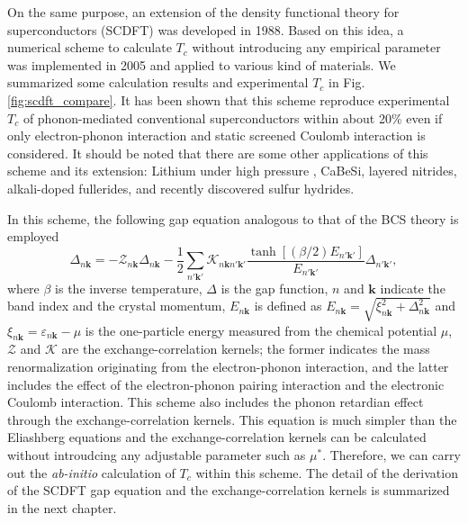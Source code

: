 On the same purpose, an extension of the density functional theory for superconductors (SCDFT)
was developed in 1988\cite{Oliveira1988}. Based on this idea, a numerical scheme to calculate
$T_c$ without introducing any empirical parameter was implemented in 2005\cite{Luders2005} 
and applied to various kind of materials. We summarized some calculation results and experimental 
$T_c$ in Fig.\ref{fig:scdft_compare}. It has been shown that this scheme reproduce experimental $T_c$ 
of phonon-mediated conventional superconductors within about 20\% even if only electron-phonon 
interaction and static screened Coulomb interaction is considered.
It should be noted that there are some other applications of this scheme and its extension: 
Lithium under high pressure
\cite{Profeta2006Pressure, RA2013}, CaBeSi\cite{Bersier2009CaBeSi}, layered nitrides\cite{RA2012}, 
alkali-doped fullerides\cite{RA2013alkali}, and recently discovered sulfur hydrides\cite{RA2015}.

In this scheme, the following gap equation analogous to that of the BCS theory is employed
%
\begin{equation}
	\Delta_{n \bm k} = -{\mathcal Z}_{n \bm k}\Delta_{n \bm k} - \frac{1}{2}
	\sum_{n' \bm k'} {\mathcal K}_{n \bm k n' \bm k'} \frac{\tanh[(\beta/2)E_{n' \bm k'}]}
	{E_{n' \bm k'}} \Delta_{n' \bm k'},
	\label{eq:gapeqintro}
\end{equation}
%
where $\beta$ is the inverse temperature, $\Delta$ is the gap function,
$n$ and $\bm k$ indicate the band index and the crystal momentum, 
$E_{n \bm k} $ is defined as $E_{n\bm k} = \sqrt{\xi_{n\bm k}^2 + \Delta_{n \bm k}^2}$ and 
$\xi_{n\bm k} = \varepsilon_{n\bm k} - \mu$ is the one-particle energy measured from the chemical
potential $\mu$, $\mathcal Z$ and $\mathcal K$ are the exchange-correlation kernels; the former
indicates the mass renormalization originating from the electron-phonon interaction, and the latter
includes the effect of the electron-phonon pairing interaction and the electronic Coulomb interaction.
This scheme also includes the phonon retardian effect through the exchange-correlation kernels.
This equation is much simpler than the Eliashberg equations and the exchange-correlation kernels 
can be calculated without introudcing any adjustable parameter such as $\mu^{\ast}$.
Therefore, we can carry out the {\it ab-initio} calculation of $T_c$ within this scheme.
The detail of the derivation of the SCDFT gap equation and the exchange-correlation kernels is 
summarized in the next chapter.

